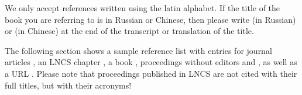 \documentclass[runningheads]{llncs}
\begin{document}
We only accept references written using the latin alphabet. If the title 
of the book you are referring to is in Russian or Chinese, then please write 
(in Russian) or (in Chinese) at the end of the transcript or translation 
of the title.

The following section shows a sample reference list with entries for
journal articles \cite{jour}, an LNCS chapter \cite{lncschap}, a book
\cite{book}, proceedings without editors \cite{proceeding1} and
\cite{proceeding2}, as well as a URL \cite{url}.
Please note that proceedings published in LNCS are not cited with their
full titles, but with their acronyms!


{\scriptsize



}
\end{document}
